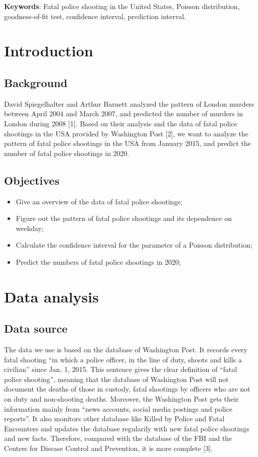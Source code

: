 \documentclass[a4paper]{article}
\begin{document}
\noindent\textbf{Keywords}: Fatal police shooting in the United States, Poisson distribution, goodness-of-fit test, confidence interval, prediction interval.



\newpage

\tableofcontents

\newpage

\section{Introduction}
	\subsection{Background}
	David Spiegelhalter and Arthur Barnett analyzed the pattern of London murders between April 2004 and March 2007, and predicted the number of murders in London during 2008 [1]. Based on their analysis and the data of fatal police shootings in the USA provided by Washington Post [2], we want to analyze the pattern of fatal police shootings in the USA from January 2015, and predict the number of fatal police shootings in 2020.

	\subsection{Objectives}
	\begin{itemize}
	\item Give an overview of the data of fatal police shootings;
	\item Figure out the pattern of fatal police shootings and its dependence on weekday;
	\item Calculate the confidence interval for the parameter of a Poisson distribution;
	\item Predict the numbers of fatal police shootings in 2020;
	\end{itemize}

\section{Data analysis}
	\subsection{Data source}
	The data we use is based on the database of Washington Post. It records every fatal shooting “in which a police officer, in the line of duty, shoots and kills a civilian” since Jan. 1, 2015. This sentence gives the clear definition of “fatal police shooting”, meaning that the database of Washington Post will not document the deaths of those in custody, fatal shootings by officers who are not on duty and non-shooting deaths. Moreover, the Washington Post gets their information mainly from “news accounts, social media postings and police reports”. It also monitors other database like Killed by Police and Fatal Encounters and updates the database regularily with new fatal police shootings and new facts. Therefore, compared with the database of the FBI and the Centers for Disease Control and Prevention, it is more complete [3].
\end{document}
